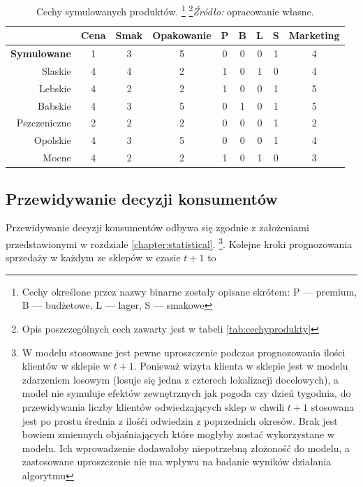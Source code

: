 \documentclass[polish, twoside, 12pt, a4paper]{article}
\theoremstyle{definition}
\theoremstyle{plain}
\theoremstyle{remark}
\begin{document}
\begin{table}[hbt] 
  \centering
  \captionsetup{margin=10pt,font=small,labelfont=bf,width=.8\textwidth}
  \caption[Cechy symulowanych produktów]{Cechy symulowanych produktów. \footnote{Cechy określone przez nazwy binarne zostały opisane skrótem: P --- premium, B --- budżetowe, L --- lager, S --- smakowe} \footnote{Opis poszczególnych cech zawarty jest w tabeli \ref{tab:cechyprodukty}}\textit{Źródło:} opracowanie własne.}
  \label{tab:produkty}
\vspace*{2ex}
  \begin{tabular}{rcccccccc}
  \hline
 & Cena & Smak & Opakowanie & P & B & L & S & Marketing \\ 
  \hline
\textbf{Symulowane} &   1 &   3 &   5 &   0 &   0 &   0 &   1 &   4 \\ 
  Slaskie &   4 &   4 &   2 &   1 &   0 &   1 &   0 &   4 \\ 
  Lebskie &   4 &   2 &   2 &   1 &   0 &   0 &   1 &   5 \\ 
  Babskie &   4 &   3 &   5 &   0 &   1 &   0 &   1 &   5 \\ 
  Pszczeniczne &   2 &   2 &   2 &   0 &   0 &   0 &   1 &   2 \\ 
  Opolskie &   4 &   3 &   5 &   0 &   0 &   0 &   1 &   4 \\ 
  Mocne &   4 &   2 &   2 &   1 &   0 &   1 &   0 &   3 \\ 
   \hline
\end{tabular}
\end{table} 



\subsection{Przewidywanie decyzji konsumentów}

Przewidywanie decyzji konsumentów odbywa się zgodnie z założeniami przedstawionymi w rozdziale \ref{chapter:statistical}. \footnote{W modelu stosowane jest pewne uproszczenie podczas prognozowania ilości klientów w sklepie w $t+1$. Ponieważ wizyta klienta w sklepie jest w modelu zdarzeniem losowym (losuje się jedna z czterech lokalizacji docelowych), a model nie symuluje efektów zewnętrznych jak pogoda czy dzień tygodnia, do przewidywania liczby klientów odwiedzających sklep w chwili $t+1$ stosowana jest po prostu średnia z ilośći odwiedzin z poprzednich okresów. Brak jest bowiem zmiennych objaśniających które mogłyby zostać wykorzystane w modelu. Ich wprowadzenie dodawałoby niepotrzebną złożoność do modelu, a zastosowane uproszczenie nie ma wpływu na badanie wyników działania algorytmu}. Kolejne kroki prognozowania sprzedaży w każdym ze sklepów w czasie $t+1$ to 
\end{document}
